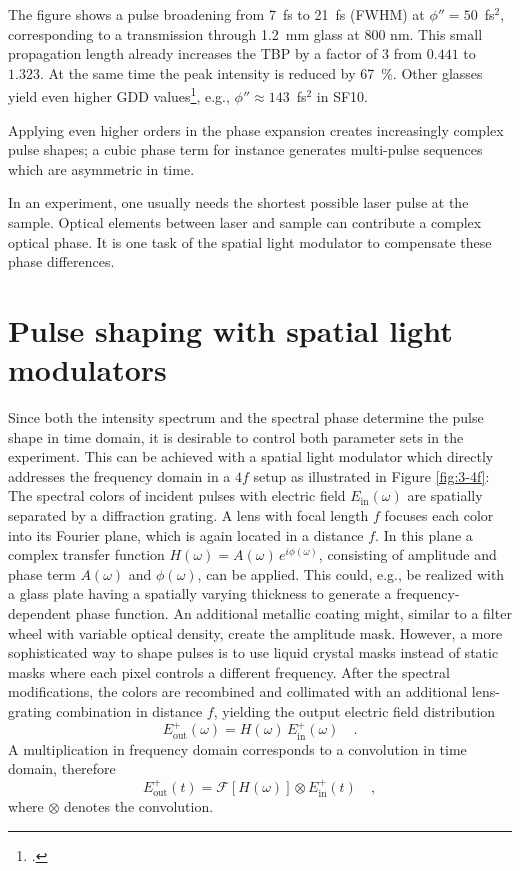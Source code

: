 The figure shows a pulse broadening from 7~fs to 21~fs (FWHM) at $\phi'' = 50$~fs$^{2}$, corresponding to a transmission through 1.2~mm  glass at 800 nm. This small propagation length already increases the TBP by a factor of 3 from $0.441$ to $1.323$. At the same time the peak intensity is reduced by 67~\%. Other glasses yield even higher GDD values\footcite{Traeger2012}, e.g., $\phi'' \approx 143$~fs$^{2}$ in SF10.

Applying even higher orders in the phase expansion creates increasingly complex pulse shapes; a cubic phase term for instance generates multi-pulse sequences which are asymmetric in time. 

In an experiment, one usually needs the shortest possible laser pulse at the sample. Optical elements between laser and sample can contribute a complex optical phase. It is one task of the spatial light modulator to compensate these phase differences.



\section{Pulse shaping with spatial light modulators}
	
Since both the intensity spectrum and the spectral phase determine the pulse shape in time domain, it is desirable to control both parameter sets in the experiment. This can be achieved with a spatial light modulator which directly addresses the frequency domain in a $4f$ setup as illustrated in Figure \ref{fig:3-4f}: The spectral colors of incident pulses with electric field $E_{\text{in}}( \omega)$ are spatially separated by a diffraction grating. A lens with focal length $f$ focuses each color into its Fourier plane, which is again located in a distance $f$. In this plane a complex transfer function $H(\omega) = A(\omega) \, e^{i \phi(\omega)}$, consisting of amplitude and phase term $A(\omega)$ and $\phi(\omega)$, can be applied. This could, e.g., be realized with a glass plate having a spatially varying thickness to generate a frequency-dependent phase function. An additional metallic coating might, similar to a filter wheel with variable optical density, create the amplitude mask. However, a more sophisticated way to shape pulses is to use liquid crystal masks instead of static masks where each pixel controls a different frequency. After the spectral modifications, the colors are recombined and collimated with an additional lens-grating combination in distance $f$, yielding the output electric field distribution
\begin{equation}
	E_{\text{out}}^{+}(\omega) = H(\omega) \, E_{\text{in}}^{+}(\omega) \quad .
\end{equation}
A multiplication in frequency domain corresponds to a convolution in time domain, therefore
\begin{equation}
	E_{\text{out}}^{+}(t) = \mathcal{F}\left[H(\omega)\right] \otimes E_{\text{in}}^{+}(t) \quad ,
\end{equation}
where $\otimes$ denotes the convolution. 


